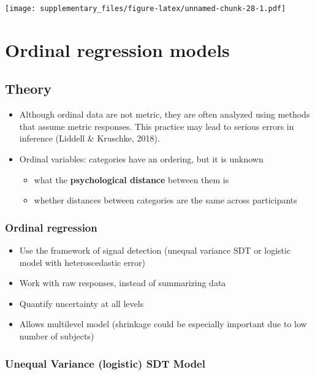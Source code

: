 \documentclass[
  man,floatsintext]{apa7}
\providecommand{\tightlist}{%
  \setlength{\itemsep}{0pt}\setlength{\parskip}{0pt}}
\begin{document}
\texttt{[image: supplementary\_files/figure-latex/unnamed-chunk-28-1.pdf]}

\hypertarget{ordinal-regression-models}{%
\section{Ordinal regression models}\label{ordinal-regression-models}}

\hypertarget{theory}{%
\subsection{Theory}\label{theory}}

\begin{itemize}
\tightlist
\item
  Although ordinal data are not metric, they are often analyzed using methods that assume metric responses. This practice may lead to serious errors in inference (Liddell \& Kruschke, 2018).
\item
  Ordinal variables: categories have an ordering, but it is unknown

  \begin{itemize}
  \tightlist
  \item
    what the \textbf{psychological distance} between them is
  \item
    whether distances between categories are the same across participants
  \end{itemize}
\end{itemize}

\hypertarget{ordinal-regression}{%
\subsubsection{Ordinal regression}\label{ordinal-regression}}

\begin{itemize}
\tightlist
\item
  Use the framework of signal detection (unequal variance SDT or logistic model with heteroscedastic error)
\item
  Work with raw responses, instead of summarizing data
\item
  Quantify uncertainty at all levels
\item
  Allows multilevel model (shrinkage could be especially important due to low number of subjects)
\end{itemize}

\hypertarget{unequal-variance-logistic-sdt-model}{%
\subsubsection{Unequal Variance (logistic) SDT Model}\label{unequal-variance-logistic-sdt-model}}
\end{document}
